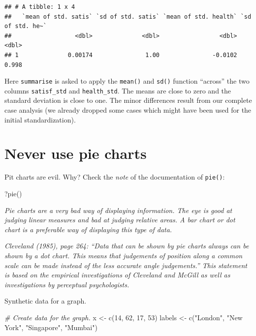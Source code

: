 \documentclass[
]{book}
\newenvironment{Shaded}{\begin{snugshade}}{\end{snugshade}}
\newcommand{\CommentTok}[1]{\textcolor[rgb]{0.56,0.35,0.01}{\textit{#1}}}
\newcommand{\DecValTok}[1]{\textcolor[rgb]{0.00,0.00,0.81}{#1}}
\newcommand{\FunctionTok}[1]{\textcolor[rgb]{0.00,0.00,0.00}{#1}}
\newcommand{\NormalTok}[1]{#1}
\newcommand{\OtherTok}[1]{\textcolor[rgb]{0.56,0.35,0.01}{#1}}
\newcommand{\StringTok}[1]{\textcolor[rgb]{0.31,0.60,0.02}{#1}}
\begin{document}
\begin{verbatim}
## # A tibble: 1 x 4
##   `mean of std. satis` `sd of std. satis` `mean of std. health` `sd of std. he~`
##                  <dbl>              <dbl>                 <dbl>            <dbl>
## 1              0.00174               1.00               -0.0102            0.998
\end{verbatim}

Here \texttt{summarise} is asked to apply the \texttt{mean()} and \texttt{sd()} function ``across'' the two columns \texttt{satisf\_std} and \texttt{health\_std}. The means are close to zero and the standard deviation is close to one. The minor differences result from our complete case analysis (we already dropped some cases which might have been used for the initial standardization).

\hypertarget{never-use-pie-charts}{%
\section{Never use pie charts}\label{never-use-pie-charts}}

Pit charts are evil. Why? Check the \emph{note} of the documentation of \texttt{pie()}:

\begin{Shaded}
\begin{Highlighting}[]
\NormalTok{?}\FunctionTok{pie}\NormalTok{()}
\end{Highlighting}
\end{Shaded}

\emph{Pie charts are a very bad way of displaying information. The eye is good at judging linear measures and bad at judging relative areas. A bar chart or dot chart is a preferable way of displaying this type of data.}

\emph{Cleveland (1985), page 264: ``Data that can be shown by pie charts always can be shown by a dot chart. This means that judgements of position along a common scale can be made instead of the less accurate angle judgements.'' This statement is based on the empirical investigations of Cleveland and McGill as well as investigations by perceptual psychologists.}

Synthetic data for a graph.

\begin{Shaded}
\begin{Highlighting}[]
\CommentTok{\# Create data for the graph.}
\NormalTok{x }\OtherTok{\textless{}{-}} \FunctionTok{c}\NormalTok{(}\DecValTok{14}\NormalTok{, }\DecValTok{62}\NormalTok{, }\DecValTok{17}\NormalTok{, }\DecValTok{53}\NormalTok{)}
\NormalTok{labels }\OtherTok{\textless{}{-}} \FunctionTok{c}\NormalTok{(}\StringTok{"London"}\NormalTok{, }\StringTok{"New York"}\NormalTok{, }\StringTok{"Singapore"}\NormalTok{, }\StringTok{"Mumbai"}\NormalTok{)}
\end{Highlighting}
\end{Shaded}
\end{document}
